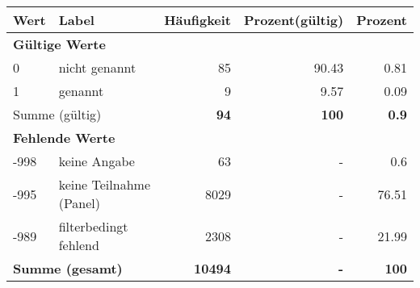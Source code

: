      \begin{longtable}{lXrrr}
     \toprule
     \textbf{Wert} & \textbf{Label} & \textbf{Häufigkeit} & \textbf{Prozent(gültig)} & \textbf{Prozent} \\
     \endhead
     \midrule
     \multicolumn{5}{l}{\textbf{Gültige Werte}}\\

     0 &
     \multicolumn{1}{X}{ nicht genannt   } &


       \num{85} &
       \num[round-mode=places,round-precision=2]{90,43} &
         \num[round-mode=places,round-precision=2]{0,81} \\

     1 &
     \multicolumn{1}{X}{ genannt   } &


       \num{9} &
       \num[round-mode=places,round-precision=2]{9,57} &
         \num[round-mode=places,round-precision=2]{0,09} \\
     \midrule
     \multicolumn{2}{l}{Summe (gültig)} &
       \textbf{\num{94}} &
     \textbf{100} &
       \textbf{\num[round-mode=places,round-precision=2]{0,9}} \\
     \multicolumn{5}{l}{\textbf{Fehlende Werte}}\\
       -998 &
       keine Angabe &
         \num{63} &
        - &
         \num[round-mode=places,round-precision=2]{0,6} \\
       -995 &
       keine Teilnahme (Panel) &
         \num{8029} &
        - &
         \num[round-mode=places,round-precision=2]{76,51} \\
       -989 &
       filterbedingt fehlend &
         \num{2308} &
        - &
         \num[round-mode=places,round-precision=2]{21,99} \\
     \midrule
     \multicolumn{2}{l}{\textbf{Summe (gesamt)}} &
          \textbf{\num{10494}} &
        \textbf{-} &
        \textbf{100} \\
     \bottomrule
     \end{longtable}
     
